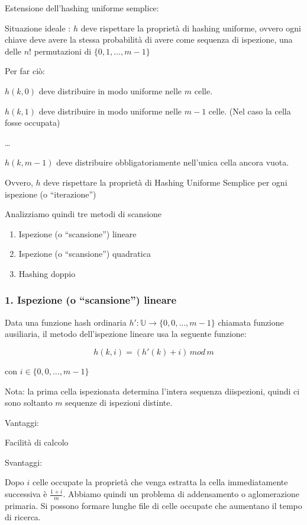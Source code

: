 \documentclass[11pt,a4paper,twoside,openright]{book}
\providecommand{\tightlist}{\setlength{\itemsep}{0pt}\setlength{\parskip}{0pt}}
\begin{document}
{Estensione dell'hashing uniforme semplice: }

{Situazione ideale : }{$h$ deve rispettare la proprietà di }{hashing uniforme}{, ovvero ogni chiave deve avere la stessa probabilità di avere come sequenza di ispezione, una delle $n!$ permutazioni di $\{0,1,\ldots,m-1\}$}

{Per far ciò:}

{$h(k,0)$ deve distribuire in modo uniforme nelle $m$ celle.}

{$h(k,1)$ deve distribuire in modo uniforme nelle $m-1$ celle. (Nel caso la cella fosse occupata)}

{\ldots{}}

{$h(k,m-1)$ deve distribuire obbligatoriamente nell'unica cella ancora vuota.}

{Ovvero, $h$ deve rispettare la proprietà di Hashing Uniforme Semplice per ogni ispezione (o ``iterazione'') }

{Analizziamo quindi tre metodi di scansione}

\begin{enumerate}
\tightlist
\item
  {Ispezione (o ``scansione'') lineare}
\item
  {Ispezione (o ``scansione'') quadratica}
\item
  {Hashing doppio}
\end{enumerate}

\subsubsection{1. Ispezione (o ``scansione'') lineare}

{Data una funzione hash ordinaria $h':\mathbb{U} \rightarrow \{0,0,\ldots,m-1\}$ chiamata funzione ausiliaria, il metodo dell'ispezione lineare usa la seguente funzione:}

\begin{equation}
h(k,i) = (h'(k) + i)\,mod\,m
\end{equation}

{con $i \in \{0,0,\ldots,m-1\}$}

{Nota: la prima cella ispezionata determina l'intera sequenza diispezioni, quindi ci sono soltanto $m$ sequenze di ispezioni distinte.}

{Vantaggi: }

{Facilità di calcolo}

{Svantaggi}{: }

{Dopo $i$ celle occupate la proprietà che venga estratta la cella immediatamente successiva è $\frac{1+i}{m}$. Abbiamo quindi un problema di addensamento o aglomerazione primaria. Si possono formare lunghe file di celle occupate che aumentano il tempo di ricerca.}
\end{document}
